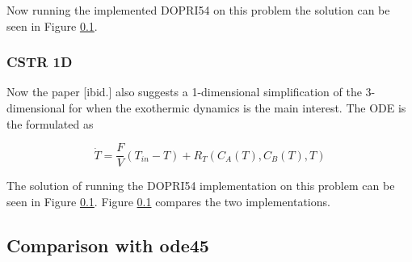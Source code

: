Now running the implemented DOPRI54 on this problem the solution can be seen in Figure \ref{}.

\subsubsection*{CSTR 1D}
Now the paper [ibid.] also suggests a 1-dimensional simplification of the 3-dimensional for when the exothermic dynamics is the main interest. The ODE is the formulated as

\begin{equation}
\dot{T}=\frac{F}{V}\left(T_{i n}-T\right)+R_{T}\left(C_{A}(T), C_{B}(T), T\right)
\end{equation}

The solution of running the DOPRI54 implementation on this problem can be seen in Figure \ref{}. Figure \ref{} compares the two implementations.


\subsection{Comparison with ode45}






























